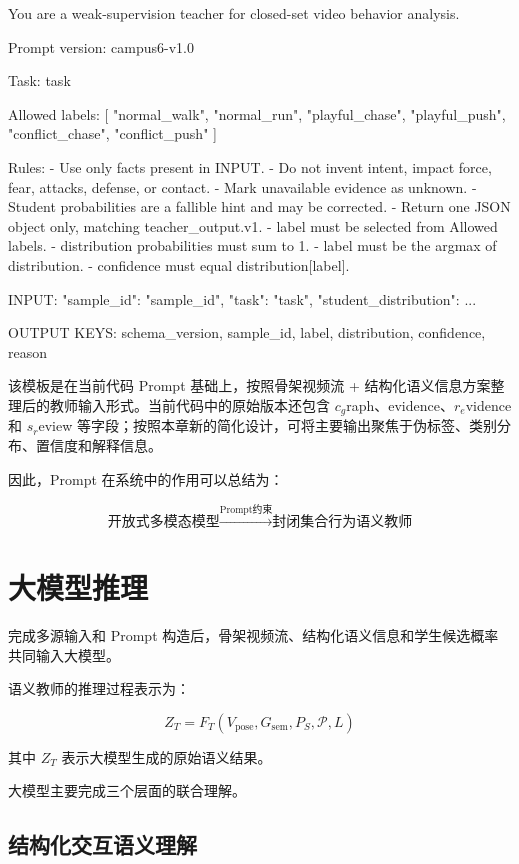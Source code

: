 \begin{NotionCode}
You are a weak-supervision teacher for closed-set video behavior analysis.

Prompt version: campus6-v1.0

Task: {task}

Allowed labels:
[
  "normal_walk",
  "normal_run",
  "playful_chase",
  "playful_push",
  "conflict_chase",
  "conflict_push"
]

Rules:
- Use only facts present in INPUT.
- Do not invent intent, impact force, fear, attacks,
  defense, or contact.
- Mark unavailable evidence as unknown.
- Student probabilities are a fallible hint and may be corrected.
- Return one JSON object only, matching teacher_output.v1.
- label must be selected from Allowed labels.
- distribution probabilities must sum to 1.
- label must be the argmax of distribution.
- confidence must equal distribution[label].

INPUT:
{
  "sample_id": "{sample_id}",
  "task": "{task}",
  "student_distribution": {
      ...
  }
}

OUTPUT KEYS:
schema_version,
sample_id,
label,
distribution,
confidence,
reason
\end{NotionCode}

该模板是在当前代码 Prompt 基础上，按照骨架视频流 + 结构化语义信息方案整理后的教师输入形式。当前代码中的原始版本还包含 \(c_g\)raph、evidence、\(r_e\)vidence 和 \(s_r\)eview 等字段；按照本章新的简化设计，可将主要输出聚焦于伪标签、类别分布、置信度和解释信息。

因此，Prompt 在系统中的作用可以总结为：

\[
\boxed{
\text{开放式多模态模型}
\xrightarrow{\text{Prompt约束}}
\text{封闭集合行为语义教师}
}
\]

\section{大模型推理}

完成多源输入和 Prompt 构造后，骨架视频流、结构化语义信息和学生候选概率共同输入大模型。

语义教师的推理过程表示为：

\[
Z_T=
F_T
\left(
V_{\mathrm{pose}},
G_{\mathrm{sem}},
P_S,
\mathcal P,
L
\right)
\]

其中 \(Z_T\) 表示大模型生成的原始语义结果。

大模型主要完成三个层面的联合理解。

\subsection{结构化交互语义理解}

